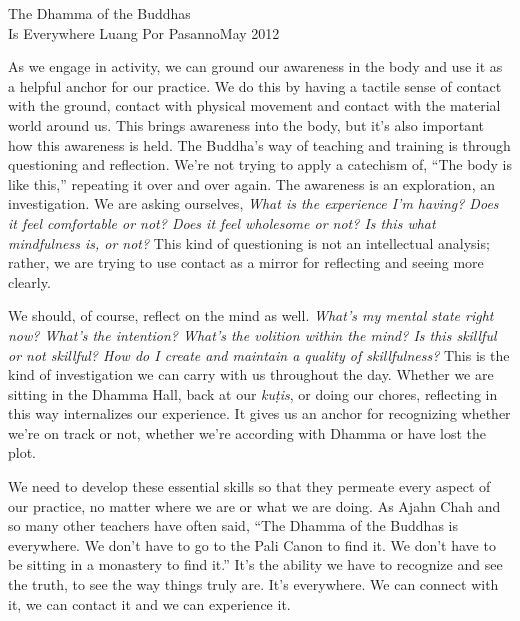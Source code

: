 {The Dhamma of the Buddhas\\Is Everywhere}
{Luang Por Pasanno}{May 2012}

As we engage in activity, we can ground our awareness in the body and 
use it as a helpful anchor for our practice. We do this by having a 
tactile sense of contact with the ground, contact with physical 
movement and contact with the material world around us. This brings 
awareness into the body, but it's also important how this awareness is 
held. The Buddha's way of teaching and training is through questioning 
and reflection. We're not trying to apply a catechism of, ``The body is 
like this,'' repeating it over and over again. The awareness is an 
exploration, an investigation. We are asking ourselves, \emph{What is 
the experience I'm having? Does it feel comfortable or not? Does it 
feel wholesome or not? Is this what mindfulness is, or not?} This kind 
of questioning is not an intellectual analysis; rather, we are trying 
to use contact as a mirror for reflecting and seeing more clearly.

We should, of course, reflect on the mind as well. \emph{What's my 
mental state right now? What's the intention? What's the volition 
within the mind? Is this skillful or not skillful? How do I create and 
maintain a quality of skillfulness?} This is the kind of investigation 
we can carry with us throughout the day. Whether we are sitting in the 
Dhamma Hall, back at our \emph{kuṭis}, or doing our chores, 
reflecting in this way internalizes our experience. It gives us an 
anchor for recognizing whether we're on track or not, whether we're 
according with Dhamma or have lost the plot.

We need to develop these essential skills so that they permeate every 
aspect of our practice, no matter where we are or what we are doing. As 
Ajahn Chah and so many other teachers have often said, ``The Dhamma of 
the Buddhas is everywhere. We don't have to go to the Pali Canon to 
find it. We don't have to be sitting in a monastery to find it.'' It's 
the ability we have to recognize and see the truth, to see the way 
things truly are. It's everywhere. We can connect with it, we can 
contact it and we can experience it.

